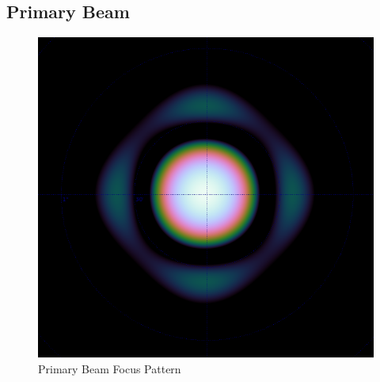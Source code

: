 \documentclass{article}
\begin{document}
\newpage


\begin{appendix}
\section{Primary Beam}
\begin{figure}[H]
	\centering
	\label{beam}
	\includegraphics[scale=0.28]{beam.png}
	\caption{Primary Beam Focus Pattern\cite{oleg}}
\end{figure}

\end{appendix}
\end{document}
